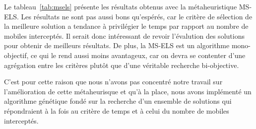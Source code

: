     	Le tableau~\ref{tab:msels} présente les résultats obtenus avec la métaheuristique MS-ELS. Les résultats ne sont pas aussi bons qu'espérés, car le critère de sélection de la meilleure solution a tendance à privilégier le temps par rapport au nombre de mobiles interceptés. Il serait donc intéressant de revoir l'évalution des solutions pour obtenir de meilleurs résultats. De plus, la MS-ELS est un algorithme mono-objectif, ce qui le rend aussi moins avantageux, car on devra se contenter d'une agrégation entre les critères plutôt que d'une véritable recherche bi-objective.
    	
    C'est pour cette raison que nous n'avons pas concentré notre travail sur l'amélioration de cette métaheurisque et qu'à la place, nous avons implémenté un algorithme génétique fondé sur la recherche d'un ensemble de solutions qui répondraient à la fois au critère de temps et à celui du nombre de mobiles interceptés.
    	
